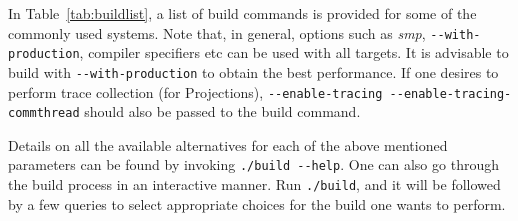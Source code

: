 In Table~\ref{tab:buildlist}, a list of build commands is provided for some of the commonly 
used systems. Note that, in general, options such as {\em smp},
\verb|--with-production|, compiler specifiers etc can be used with all targets.
It is advisable to build with \verb|--with-production| to obtain the best
performance.  If one desires to perform trace collection (for Projections),
\verb|--enable-tracing --enable-tracing-commthread| should also be passed to the
build command.

Details on all the available alternatives for each of the above mentioned
parameters can be found by invoking \verb|./build --help|. One can also go through the
build process in an interactive manner. Run \verb|./build|, and it will be followed by
a few queries to select appropriate choices for the build one wants to perform.


